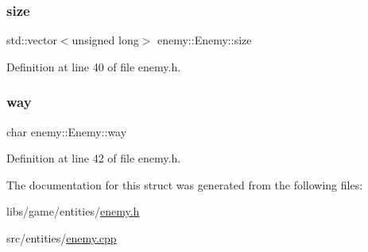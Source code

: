 \subsubsection{\texorpdfstring{size}{size}}
{\footnotesize\ttfamily std\+::vector$<$unsigned long$>$ enemy\+::\+Enemy\+::size}



Definition at line 40 of file enemy.\+h.

\mbox{\label{structenemy_1_1_enemy_a6b7b4f12f9ed4a167c1ed0444dda20ba}} 
\subsubsection{\texorpdfstring{way}{way}}
{\footnotesize\ttfamily char enemy\+::\+Enemy\+::way}



Definition at line 42 of file enemy.\+h.



The documentation for this struct was generated from the following files\+:\begin{DoxyCompactItemize}
\item 
libs/game/entities/\hyperlink{enemy_8h}{enemy.\+h}\item 
src/entities/\hyperlink{enemy_8cpp}{enemy.\+cpp}\end{DoxyCompactItemize}
